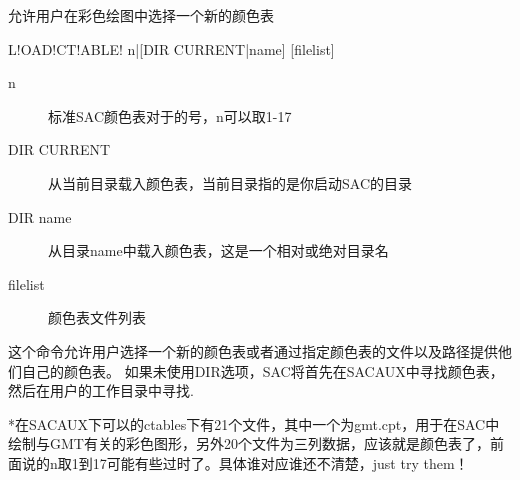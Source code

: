 \label{cmd:loadctable}

允许用户在彩色绘图中选择一个新的颜色表

\begin{SACSTX}
L!OAD!CT!ABLE! n|[DIR CURRENT|name] [filelist]
\end{SACSTX}

\begin{description}
\item [n] 标准SAC颜色表对于的号，n可以取1-17
\item [DIR CURRENT] 从当前目录载入颜色表，当前目录指的是你启动SAC的目录
\item [DIR name] 从目录name中载入颜色表，这是一个相对或绝对目录名 
\item [filelist] 颜色表文件列表 
\end{description}

这个命令允许用户选择一个新的颜色表或者通过指定颜色表的文件以及路径提供他们自己的颜色表。
如果未使用DIR选项，SAC将首先在SACAUX中寻找颜色表，然后在用户的工作目录中寻找.

*在SACAUX下可以的ctables下有21个文件，其中一个为gmt.cpt，用于在SAC中绘制与GMT有关的彩色图形，另外20个文件为三列数据，应该就是颜色表了，前面说的n取1到17可能有些过时了。具体谁对应谁还不清楚，just try them！
